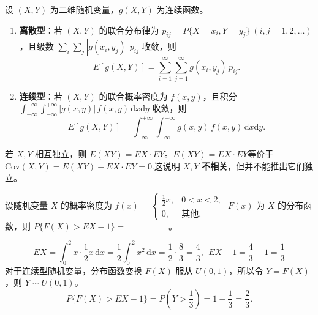 \documentclass[lang=cn,11pt]{elegantbook}
\begin{document}
\begin{definition}[二维随机变量函数的期望] \label{def:2d-expectation}
设 \((X,Y)\) 为二维随机变量，\(g(X,Y)\) 为连续函数。
\begin{enumerate}
    \item \textbf{离散型}：若 \((X,Y)\) 的联合分布律为 \(p_{ij} = P\{X=x_i, Y=y_j\}\ (i,j=1,2,\dots)\)，且级数 \(\sum\limits_{i}\sum\limits_{j} |g(x_i,y_j)|\,p_{ij}\) 收敛，则
    \[
    E[g(X,Y)] = \sum_{i=1}^{\infty}\sum_{j=1}^{\infty} g(x_i, y_j)\,p_{ij}.
    \]
    \item \textbf{连续型}：若 \((X,Y)\) 的联合概率密度为 \(f(x,y)\)，且积分 \(\int_{-\infty}^{+\infty}\int_{-\infty}^{+\infty} |g(x,y)|\,f(x,y)\,\mathrm{d}x\mathrm{d}y\) 收敛，则
    \[
    E[g(X,Y)] = \int_{-\infty}^{+\infty}\int_{-\infty}^{+\infty} g(x,y)\,f(x,y)\,\mathrm{d}x\mathrm{d}y.
    \]
\end{enumerate}
若 \(X, Y\) 相互独立，则 \(E(XY) = EX \cdot EY\)。\(E(XY)=EX\cdot EY\)等价于\(\mathrm{Cov}(X,Y)=E(XY)-EX\cdot EY=0.\)这说明 \(X,Y\) \textbf{不相关}，但并不能推出它们独立。
\end{definition}


\begin{exercise}\label{exer:4-6-fx}
设随机变量 \(X\) 的概率密度为 \(f(x) = \begin{cases} \frac12x, & 0 < x < 2, \\ 0, & \text{其他}, \end{cases}\) \(F(x)\) 为 \(X\) 的分布函数，则 \(P\{F(X) > EX - 1\} =\,\underline{\hspace{2cm}}\)。
\end{exercise}

\begin{solution}
\[
EX=\int_0^2 x\cdot \frac12x\,\mathrm dx
=\frac12\int_0^2 x^2\,\mathrm dx
=\frac12\cdot\frac{8}{3}
=\frac43,~~EX-1=\frac43-1=\frac13
\]
对于连续型随机变量，分布函数变换 \(F(X)\) 服从 \(U(0,1)\)，所以令 \(Y=F(X)\)，则 \(Y\sim U(0,1)\)。
\[
P\{F(X)>EX-1\}=P\left(Y>\frac13\right)=1-\frac13=\frac23.
\]
\end{solution}
\end{document}
